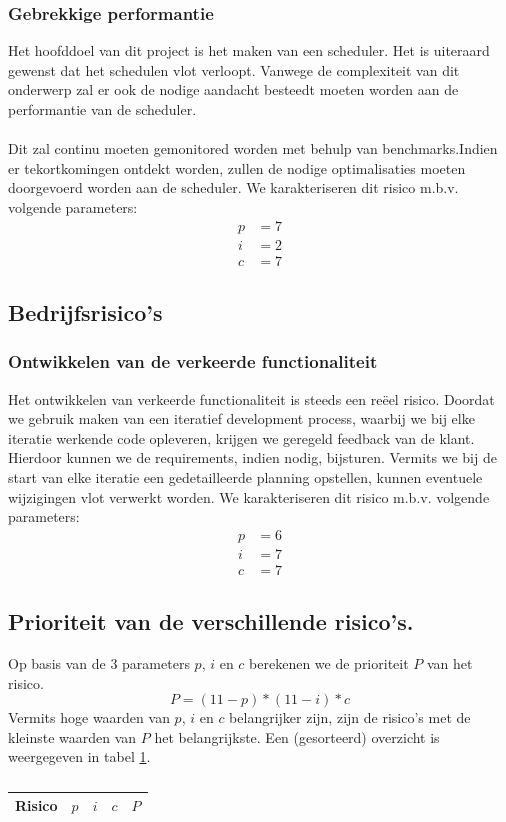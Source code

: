 \subsubsection{Gebrekkige performantie}
Het hoofddoel van dit project is het maken van een scheduler. Het is uiteraard gewenst dat het schedulen vlot verloopt. Vanwege de complexiteit van dit onderwerp zal er ook de nodige aandacht besteedt moeten worden aan de performantie van de scheduler.
\\
\\
Dit zal continu moeten gemonitored worden met behulp van benchmarks.Indien er tekortkomingen ontdekt worden, zullen de nodige optimalisaties moeten doorgevoerd worden aan de scheduler. We karakteriseren dit risico m.b.v. volgende parameters:
\begin{align*}
	p &= 7\\
	i &= 2\\
	c &= 7
\end{align*}


\subsection{Bedrijfsrisico's}
\subsubsection{Ontwikkelen van de verkeerde functionaliteit}
Het ontwikkelen van verkeerde functionaliteit is steeds een re\"{e}el risico. Doordat we gebruik maken van een iteratief development process, waarbij we bij elke iteratie werkende code opleveren, krijgen we geregeld feedback van de klant. Hierdoor kunnen we de requirements, indien nodig, bijsturen. Vermits we bij de start van elke iteratie een gedetailleerde planning opstellen, kunnen eventuele wijzigingen vlot verwerkt worden. We karakteriseren dit risico m.b.v. volgende parameters:
\begin{align*}
	p &= 6\\
	i &= 7\\
	c &= 7
\end{align*}

\subsection{Prioriteit van de verschillende risico's.} \label{sec:riskPriority}
Op basis van de 3 parameters $p$, $i$ en $c$ berekenen we de prioriteit $P$ van het risico. %
$$ P = (11 - p)*(11 - i)*c$$
Vermits hoge waarden van $p$, $i$ en $c$ belangrijker zijn, zijn de risico's met de kleinste waarden van $P$ het belangrijkste. Een (gesorteerd) overzicht is weergegeven in tabel \ref{tab:riskPriorityTabel}.
\begin{table} [H]
	\centering
	\caption{}
	\begin{tabular} {l|ccc|c}
		Risico & $p$ & $i$ & $c$ & $P$ \\
		\hline
		 
	\end{tabular}
	\label{tab:riskPriorityTabel}
\end{table}

